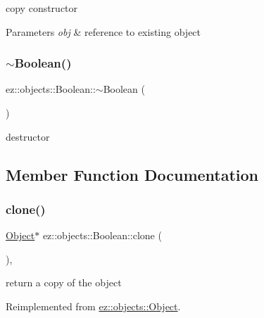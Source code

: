 copy constructor 
\begin{DoxyParams}{Parameters}
{\em obj} & reference to existing object \\
\hline
\end{DoxyParams}
\mbox{\label{classez_1_1objects_1_1Boolean_a1650855ce9987132244eb04905f8585b}} 
\subsubsection{\texorpdfstring{$\sim$\+Boolean()}{~Boolean()}}
{\footnotesize\ttfamily ez\+::objects\+::\+Boolean\+::$\sim$\+Boolean (\begin{DoxyParamCaption}{ }\end{DoxyParamCaption})\hspace{0.3cm}{\ttfamily [inline]}}

destructor 

\subsection{Member Function Documentation}
\mbox{\label{classez_1_1objects_1_1Boolean_a3b1b1775d4869ba005cf4d20623d1260}} 
\subsubsection{\texorpdfstring{clone()}{clone()}}
{\footnotesize\ttfamily \hyperlink{classez_1_1objects_1_1Object}{Object}$\ast$ ez\+::objects\+::\+Boolean\+::clone (\begin{DoxyParamCaption}{ }\end{DoxyParamCaption})\hspace{0.3cm}{\ttfamily [inline]}, {\ttfamily [virtual]}}

return a copy of the object 

Reimplemented from \hyperlink{classez_1_1objects_1_1Object_acf444b2581d898eb4b8c92c2d5865c9e}{ez\+::objects\+::\+Object}.

\mbox{\label{classez_1_1objects_1_1Boolean_a6ccc996f98fece5fbe6fd6ebcbd39f4a}} 
